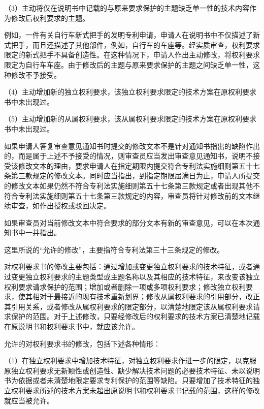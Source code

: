 {\setlength{\parindent}{17.1bp}（3）主动将仅在说明书中记载的与原来要求保护的主题缺乏单一性的技术内容作为修改后权利要求的主题。\par}

例如，一件有关自行车新式把手的发明专利申请，申请人在说明书中不仅描述了新式把手，而且还描述了其他部件，例如，自行车的车座等。经实质审查，权利要求限定的新式把手不具备创造性。在这种情况下，申请人作出主动修改，将权利要求限定为自行车车座。由于修改后的主题与原来要求保护的主题之间缺乏单一性，这种修改不予接受。

{\setlength{\parindent}{17.1bp}（4）主动增加新的独立权利要求，该独立权利要求限定的技术方案在原权利要求书中未出现过。\par}

{\setlength{\parindent}{17.1bp}（5）主动增加新的从属权利要求，该从属权利要求限定的技术方案在原权利要求书中未出现过。\par}

如果申请人答复审查意见通知书时提交的修改文本不是针对通知书指出的缺陷作出的，而是属于上述不予接受的情况，则审查员应当发出审查意见通知书，说明不接受该修改文本的理由，要求申请人在指定期限内提交符合专利法实施细则第五十七条第三款规定的修改文本。同时应当指出，到指定期限届满日为止，申请人所提交的修改文本如果仍然不符合专利法实施细则第五十七条第三款规定或者出现其他不符合专利法实施细则第五十七条第三款规定的内容，审查员将针对修改前的文本继续审查，如作出授权或驳回决定。

如果审查员对当前修改文本中符合要求的部分文本有新的审查意见，可以在本次通知书中一并指出。

这里所说的“允许的修改”，主要指符合专利法第三十三条规定的修改。

对权利要求书的修改主要包括：通过增加或变更独立权利要求的技术特征，或者通过变更独立权利要求的主题类型或主题名称以及其相应的技术特征，来改变该独立权利要求请求保护的范围；增加或者删除一项或多项权利要求；修改独立权利要求，使其相对于最接近的现有技术重新划界；修改从属权利要求的引用部分，改正其引用关系，或者修改从属权利要求的限定部分，以清楚地限定该从属权利要求请求保护的范围。对于上述修改，只要经修改后的权利要求的技术方案已清楚地记载在原说明书和权利要求书中，就应该允许。

允许的对权利要求书的修改，包括下述各种情形：

{\setlength{\parindent}{17.1bp}（1）在独立权利要求中增加技术特征，对独立权利要求作进一步的限定，以克服原独立权利要求无新颖性或创造性、缺少解决技术问题的必要技术特征、未以说明书为依据或者未清楚地限定要求专利保护的范围等缺陷。只要增加了技术特征的独立权利要求所述的技术方案未超出原说明书和权利要求书记载的范围，这样的修改就应当被允许。\par}

